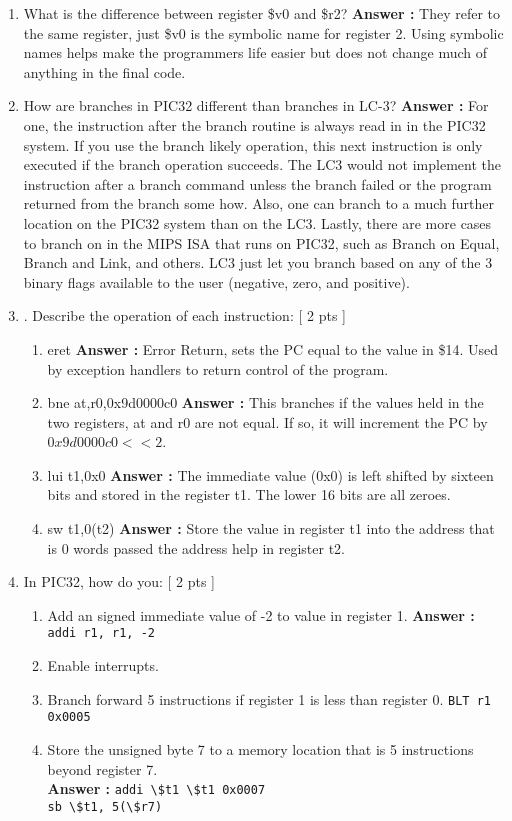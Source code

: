\documentclass[a4paper,11pt]{article}
\newcommand{\answer}{\textbf{Answer : }}
\begin{document}
\begin{enumerate}
\item What is the difference between register \$v0 and \$r2? \answer They refer to the same register, just \$v0 is the symbolic name for register 2. Using symbolic names helps make the programmers life easier but does not change much of anything in the final code.

\item How are branches in PIC32 different than branches in LC-3? \answer For one, the instruction after the branch routine is always read in in the PIC32 system. If you use the branch likely operation, this next instruction is only executed if the branch operation succeeds. The LC3 would not implement the instruction after a branch command unless the branch failed or the program returned from the branch some how. Also, one can branch to a much further location on the PIC32 system than on the LC3. Lastly, there are more cases to branch on in the MIPS ISA that runs on PIC32, such as Branch on Equal, Branch and Link, and others. LC3 just let you branch based on any  of the 3 binary flags available to the user (negative, zero, and positive).

\item. Describe the operation of each instruction: [ 2 pts ]
\begin{enumerate}
\item eret \answer Error Return, sets the PC equal to the value in \$14. Used by exception handlers to return control of the program.
\item bne at,r0,0x9d0000c0 \answer This branches if the values held in the two registers, at and r0 are not equal. If so, it will increment the PC by $0x9d0000c0 << 2$. 
\item lui t1,0x0 \answer The immediate value (0x0) is left shifted by sixteen bits and stored in the register t1. The lower 16 bits are all zeroes.
\item sw t1,0(t2) \answer Store the value in register t1 into the address that is 0 words passed the address help in register t2.
\end{enumerate}

\item In PIC32, how do you: [ 2 pts ]
\begin{enumerate}
\item Add an signed immediate value of -2 to value in register 1. \answer \verb.addi r1, r1, -2.
\item Enable interrupts.
\item Branch forward 5 instructions if register 1 is less than register 0. \verb.BLT r1 0x0005.
\item Store the unsigned byte 7 to a memory location that is 5 instructions beyond register 7.  \\
\answer
\verb.addi \$t1 \$t1 0x0007. \\
\verb.sb \$t1, 5(\$r7).
\end{enumerate}


\end{enumerate}
\end{document}
